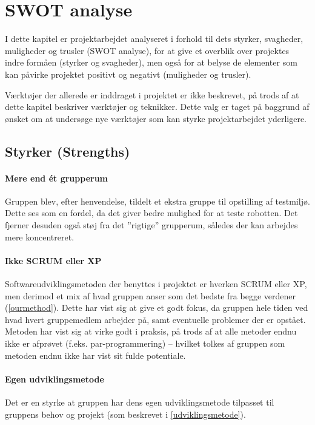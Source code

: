 \section{SWOT analyse}\label{swot:analyse}
I dette kapitel er projektarbejdet analyseret i forhold til dets styrker, svagheder, muligheder og trusler (SWOT analyse), for at give et overblik over projektes indre formåen (styrker og svagheder), men også for at belyse de elementer som kan påvirke projektet positivt og negativt (muligheder og trusler).

Værktøjer der allerede er inddraget i projektet er ikke beskrevet, på trods af at dette kapitel beskriver værktøjer og teknikker.
Dette valg er taget på baggrund af ønsket om at undersøge nye værktøjer som kan styrke projektarbejdet yderligere.

\subsection{Styrker \textnormal{(\textbf{S}trengths)}}

\paragraph{Mere end ét grupperum}
Gruppen blev, efter henvendelse, tildelt et ekstra gruppe til opstilling af testmiljø.
Dette ses som en fordel, da det giver bedre mulighed for at teste robotten.
Det fjerner desuden også støj fra det ''rigtige'' grupperum, således der kan arbejdes mere koncentreret.

\paragraph{Ikke SCRUM eller XP}
Softwareudviklingsmetoden der benyttes i projektet er hverken SCRUM eller XP, men derimod et mix af hvad gruppen anser som det bedste fra begge verdener (\cref{ourmethod}).
Dette har vist sig at give et godt fokus, da gruppen hele tiden ved hvad hvert gruppemedlem arbejder på, samt eventuelle problemer der er opstået.
Metoden har vist sig at virke godt i praksis, på trods af at alle metoder endnu ikke er afprøvet (f.eks. par-programmering) -- hvilket tolkes af gruppen som metoden endnu ikke har vist sit fulde potentiale.

\paragraph{Egen udviklingsmetode}
Det er en styrke at gruppen har dens egen udviklingsmetode tilpasset til gruppens behov og projekt (som beskrevet i \cref{udviklingsmetode}).

